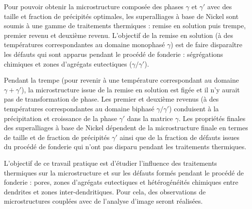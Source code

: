 Pour pouvoir obtenir la microstructure composée des phases $\gamma$ et $\gamma'$
avec des taille et fraction de précipités optimales, les superalliages à base de
Nickel sont soumis à une gamme de traitements thermiques : remise en solution puis
trempe, premier revenu et deuxième revenu. L’objectif de la remise en solution
(à des températures correspondantes au domaine monophasé $\gamma$) est de faire
disparaître les défauts qui sont apparus pendant le procédé de fonderie : 
ségrégations chimiques et zones d’agrégats eutectiques ($\gamma / \gamma'$).

Pendant la trempe (pour revenir à une température correspondant au domaine
$\gamma + \gamma'$), la microstructure issue de la remise en solution est figée 
et il n’y aurait pas de transformation de phase. Les premier et deuxième revenus 
(à des températures correspondantes au domaine biphasé $\gamma / \gamma'$) conduisent
à la précipitation et croissance de la phase $\gamma'$ dans la matrice $\gamma$. 
Les propriétés finales des superalliages à base de Nickel dépendent de la microstructure 
finale en termes de taille et de fraction de précipités $\gamma'$ ainsi que de la 
fraction de défauts issues du procédé de fonderie qui n’ont pas disparu pendant 
les traitements thermiques.


L’objectif de ce travail pratique est d’étudier l’influence des traitements thermiques 
sur la microstructure et sur les défauts formés pendant le procédé de fonderie : pores, 
zones d’agrégats eutectiques et hétérogénéités chimiques entre dendrites et zones 
inter-dendritiques. Pour cela, des observations de microstructures couplées avec de 
l’analyse d’image seront réalisées.
